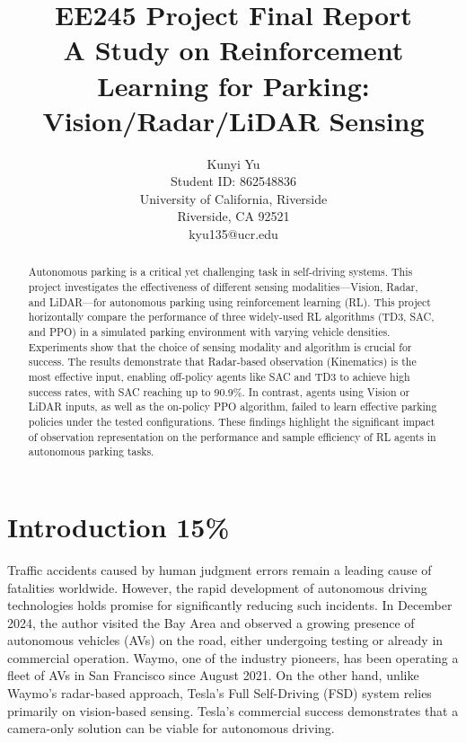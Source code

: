 \documentclass{article}
\title{EE245 Project Final Report \\ \large A Study on Reinforcement Learning for Parking: Vision/Radar/LiDAR Sensing}
\author{
  Kunyi Yu\\
  Student ID: 862548836 \\
  University of California, Riverside\\
  Riverside, CA 92521\\
  kyu135@ucr.edu
}
\begin{document}
\maketitle

\begin{abstract}
  Autonomous parking is a critical yet challenging task in self-driving systems. This project investigates the effectiveness of different sensing modalities—Vision, Radar, and LiDAR—for autonomous parking using reinforcement learning (RL). This project horizontally compare the performance of three widely-used RL algorithms (TD3, SAC, and PPO) in a simulated parking environment with varying vehicle densities. Experiments show that the choice of sensing modality and algorithm is crucial for success. The results demonstrate that Radar-based observation (Kinematics) is the most effective input, enabling off-policy agents like SAC and TD3 to achieve high success rates, with SAC reaching up to 90.9\%. In contrast, agents using Vision or LiDAR inputs, as well as the on-policy PPO algorithm, failed to learn effective parking policies under the tested configurations. These findings highlight the significant impact of observation representation on the performance and sample efficiency of RL agents in autonomous parking tasks.
\end{abstract}


\section{Introduction 15\%}

Traffic accidents caused by human judgment errors remain a leading cause of fatalities worldwide. However, the rapid development of autonomous driving technologies holds promise for significantly reducing such incidents. In December 2024, the author visited the Bay Area and observed a growing presence of autonomous vehicles (AVs) on the road, either undergoing testing or already in commercial operation. Waymo, one of the industry pioneers, has been operating a fleet of AVs in San Francisco since August 2021. On the other hand, unlike Waymo’s radar-based approach, Tesla’s Full Self-Driving (FSD) system relies primarily on vision-based sensing. Tesla’s commercial success demonstrates that a camera-only solution can be viable for autonomous driving.
\end{document}
